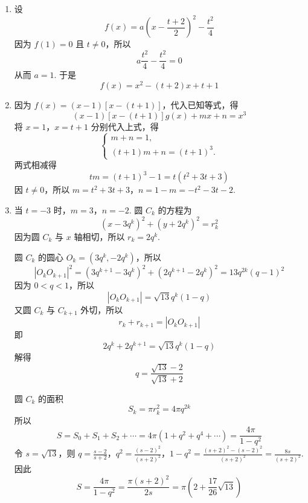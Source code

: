 \documentclass[UTF8,a4paper,oneside,11pt]{ctexbook}
\begin{document}
\begin{solution}
\begin{enumerate}
\item 设
\[
f(x)=a\left(x-\frac{t+2}{2}\right)^2-\frac{t^2}{4}
\]
因为 \(f(1)=0\) 且 \(t\neq0\)，所以
\[
a\frac{t^2}{4}-\frac{t^2}{4}=0
\]
从而 \(a=1\). 于是
\[
f(x)=x^2-(t+2)x+t+1
\]

\item 因为 \(f(x)=(x-1)[x-(t+1)]\)，代入已知等式，得
\[
(x-1)[x-(t+1)]g(x)+mx+n=x^3
\]
将 \(x=1\)，\(x=t+1\) 分别代入上式，得
\[
\begin{cases}
m+n=1,\\
(t+1)m+n=(t+1)^3.
\end{cases}
\]
两式相减得
\[
tm=(t+1)^3-1=t\left(t^2+3t+3\right)
\]
因 \(t\neq0\)，所以
\(m=t^2+3t+3\)，\(n=1-m=-t^2-3t-2\).

\item 当 \(t=-3\) 时，\(m=3\)，\(n=-2\). 圆 \(C_k\) 的方程为
\[
(x-3q^k)^2+(y+2q^k)^2=r_k^2
\]
因为圆 \(C_k\) 与 \(x\) 轴相切，所以 \(r_k=2q^k\).

圆 \(C_k\) 的圆心 \(O_k=(3q^k,-2q^k)\)，所以
\[
|O_kO_{k+1}|^2=(3q^{k+1}-3q^k)^2+(2q^{k+1}-2q^k)^2
=13q^{2k}(q-1)^2
\]
因为 \(0<q<1\)，所以
\[
|O_kO_{k+1}|=\sqrt{13}q^k(1-q)
\]
又圆 \(C_k\) 与 \(C_{k+1}\) 外切，所以
\[
r_k+r_{k+1}=|O_kO_{k+1}|
\]
即
\[
2q^k+2q^{k+1}=\sqrt{13}q^k(1-q)
\]
解得
\[
q=\frac{\sqrt{13}-2}{\sqrt{13}+2}
\]

圆 \(C_k\) 的面积
\[
S_k=\pi r_k^2=4\pi q^{2k}
\]
所以
\[
S=S_0+S_1+S_2+\cdots
=4\pi(1+q^2+q^4+\cdots)
=\frac{4\pi}{1-q^2}
\]
令 \(s=\sqrt{13}\)，则
\(q=\frac{s-2}{s+2}\)，\(q^2=\frac{(s-2)^2}{(s+2)^2}\)，\(1-q^2=\frac{(s+2)^2-(s-2)^2}{(s+2)^2} =\frac{8s}{(s+2)^2}\).
因此
\[
S=\frac{4\pi}{1-q^2}
=\frac{\pi(s+2)^2}{2s}
=\pi\left(2+\frac{17}{26}\sqrt{13}\right)
\]
\end{enumerate}
\end{solution}

\end{document}

